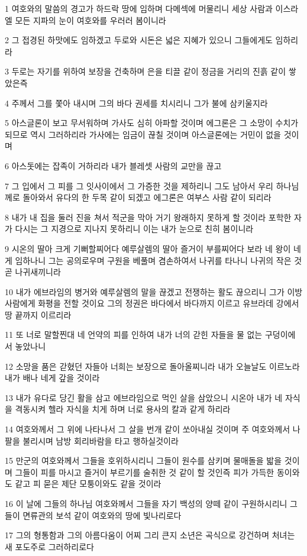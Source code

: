 \par 1 여호와의 말씀의 경고가 하드락 땅에 임하며 다메섹에 머물리니 세상 사람과 이스라엘 모든 지파의 눈이 여호와를 우러러 봄이니라
\par 2 그 접경된 하맛에도 임하겠고 두로와 시돈은 넓은 지혜가 있으니 그들에게도 임하리라
\par 3 두로는 자기를 위하여 보장을 건축하며 은을 티끌 같이 정금을 거리의 진흙 같이 쌓았은즉
\par 4 주께서 그를 쫓아 내시며 그의 바다 권세를 치시리니 그가 불에 삼키울지라
\par 5 아스글론이 보고 무서워하며 가사도 심히 아파할 것이며 에그론은 그 소망이 수치가 되므로 역시 그러하리라 가사에는 임금이 끊칠 것이며 아스글론에는 거민이 없을 것이며
\par 6 아스돗에는 잡족이 거하리라 내가 블레셋 사람의 교만을 끊고
\par 7 그 입에서 그 피를 그 잇사이에서 그 가증한 것을 제하리니 그도 남아서 우리 하나님께로 돌아와서 유다의 한 두목 같이 되겠고 에그론은 여부스 사람 같이 되리라
\par 8 내가 내 집을 둘러 진을 쳐서 적군을 막아 거기 왕래하지 못하게 할 것이라 포학한 자가 다시는 그 지경으로 지나지 못하리니 이는 내가 눈으로 친히 봄이니라
\par 9 시온의 딸아 크게 기뻐할찌어다 예루살렘의 딸아 즐거이 부를찌어다 보라 네 왕이 네게 임하나니 그는 공의로우며 구원을 베풀며 겸손하여서 나귀를 타나니 나귀의 작은 것 곧 나귀새끼니라
\par 10 내가 에브라임의 병거와 예루살렘의 말을 끊겠고 전쟁하는 활도 끊으리니 그가 이방 사람에게 화평을 전할 것이요 그의 정권은 바다에서 바다까지 이르고 유브라데 강에서 땅 끝까지 이르리라
\par 11 또 너로 말할찐대 네 언약의 피를 인하여 내가 너의 갇힌 자들을 물 없는 구덩이에서 놓았나니
\par 12 소망을 품은 갇혔던 자들아 너희는 보장으로 돌아올찌니라 내가 오늘날도 이르노라 내가 배나 네게 갚을 것이라
\par 13 내가 유다로 당긴 활을 삼고 에브라임으로 먹인 살을 삼았으니 시온아 내가 네 자식을 격동시켜 헬라 자식을 치게 하며 너로 용사의 칼과 같게 하리라
\par 14 여호와께서 그 위에 나타나서 그 살을 번개 같이 쏘아내실 것이며 주 여호와께서 나팔을 불리시며 남방 회리바람을 타고 행하실것이라
\par 15 만군의 여호와께서 그들을 호위하시리니 그들이 원수를 삼키며 물매돌을 밟을 것이며 그들이 피를 마시고 즐거이 부르기를 술취한 것 같이 할 것인즉 피가 가득한 동이와도 같고 피 묻은 제단 모퉁이와도 같을 것이라
\par 16 이 날에 그들의 하나님 여호와께서 그들을 자기 백성의 양떼 같이 구원하시리니 그들이 면류관의 보석 같이 여호와의 땅에 빛나리로다
\par 17 그의 형통함과 그의 아름다움이 어찌 그리 큰지 소년은 곡식으로 강건하며 처녀는 새 포도주로 그러하리로다

